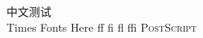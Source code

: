 \documentclass[12pt,a4paper,UTF8,adobefonts]{ctexbook}
\begin{document}
中文测试\\
Times Fonts Here ff fi fl ffi \textsc{PostScript} %
\end{document}
